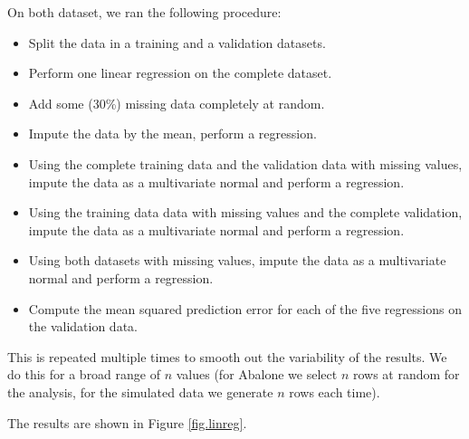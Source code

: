 \documentclass[12pt, a4paper]{memoir}
\begin{document}
On both dataset, we ran the following procedure:
\begin{itemize}
\item Split the data in a training and a validation datasets.
\item Perform one linear regression on the complete dataset.
\item Add some (30\%) missing data completely at random.
\item Impute the data by the mean, perform a regression.
\item Using the complete training data and the validation data with missing values, impute the data as a multivariate normal and perform a regression.
\item Using the training data data with missing values and the complete validation, impute the data as a multivariate normal and perform a regression.
\item Using both datasets with missing values, impute the data as a multivariate normal and perform a regression.
\item Compute the mean squared prediction error for each of the five regressions on the validation data.
\end{itemize}
		
This is repeated multiple times to smooth out the variability of the results. We do this for a broad range of $n$ values (for Abalone we select $n$ rows at random for the analysis, for the simulated data we generate $n$ rows each time).

The results are shown in Figure \ref{fig.linreg}. 
\end{document}

